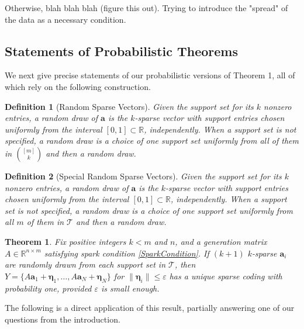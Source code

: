 \documentclass[journal, onecolumn]{IEEEtran}
\newtheorem{theorem}{Theorem}
\newtheorem{definition}{Definition}
\begin{document}
Otherwise, blah blah blah (figure this out). Trying to introduce the "spread" of the data as a necessary condition.


\subsection{Statements of Probabilistic Theorems}\label{PUT}

We next give precise statements of our probabilistic versions of Theorem 1, all of which rely on the following construction.

\begin{definition}[Random Sparse Vectors]\label{RandomDraw}
Given the support set for its $k$ nonzero entries, a random draw of $\mathbf{a}$ is the $k$-sparse vector with support entries chosen uniformly from the interval $[0, 1] \subset \mathbb{R}$, independently. When a support set is not specified, a random draw is a choice of one support set uniformly from all of them in ${[m] \choose k}$ and then a random draw.
\end{definition}

\begin{definition}[Special Random Sparse Vectors]\label{SpecialRandomDraw}
Given the support set for its $k$ nonzero entries, a random draw of $\mathbf{a}$ is the $k$-sparse vector with support entries chosen uniformly from the interval $[0, 1] \subset \mathbb{R}$, independently. When a support set is not specified, a random draw is a choice of one support set uniformly from all $m$ of them in $\mathcal{T}$ and then a random draw.
\end{definition}

\begin{theorem}\label{Theorem2}
Fix positive integers $k < m$ and $n$, and a generation matrix $A \in \mathbb{R}^{n \times m}$ satisfying spark condition \eqref{SparkCondition}. If $(k+1)$ $k$-sparse $\mathbf{a}_i$ are randomly drawn from each support set in $\mathcal{T}$, then $Y = \{A\mathbf{a}_1 + \mathbf{\eta}_1, \ldots ,  A\mathbf{a}_N + \mathbf{\eta}_N \}$ for $\|\mathbf{\eta}_i\| \leq \varepsilon$ has a unique sparse coding with probability one, provided $\varepsilon$ is small enough.
\end{theorem}

The following is a direct application of this result, partially answering one of our questions from the introduction.
\end{document}
